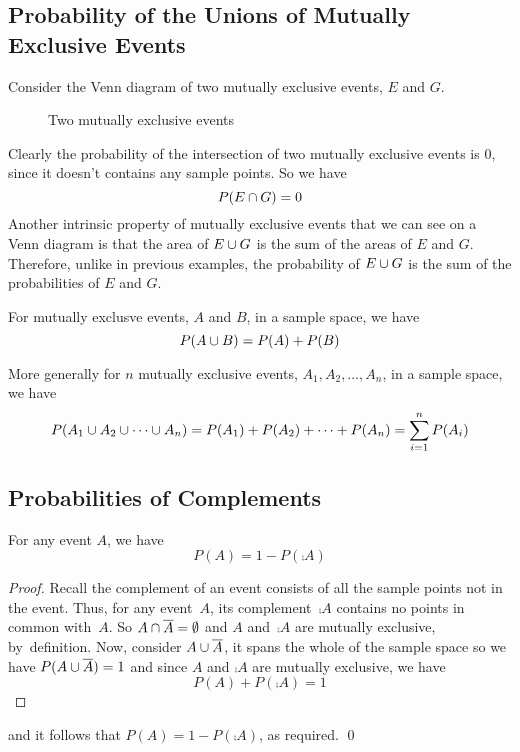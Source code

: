 \subsection*{Probability of the Unions of Mutually Exclusive Events}
Consider the Venn diagram of two mutually exclusive events, $E$ and $G$.
\begin{figure}[htp]
\centering
{}
\caption{Two mutually exclusive events} \label{fig:Two mutually exclusive events}
\end{figure}
Clearly the probability of the intersection of two mutually exclusive events is 0, since it doesn't contains any sample points. So we have 
\[
    P(E \cap G) = 0    
\]
Another intrinsic property of mutually exclusive events that we can see on a Venn diagram is that the area of $E \cup G$ is the sum of the areas of $E$ and $G$. Therefore, unlike in previous examples, the probability of $E \cup G$ is the sum of the probabilities of $E$ and $G$.
\begin{theorem}
For mutually exclusve events, $A$ and $B$, in a sample space, we have
\[
    P(A \cup B) = P(A) + P(B)
\]
\end{theorem}
\begin{theorem}
More generally for $n$ mutually exclusive events, $A_1,A_2,\ldots,A_n$, in a sample space, we have
\[
    P(A_1 \cup A_2 \cup \cdots \cup A_n) = P(A_1) + P(A_2) + \cdots + P(A_n) = \sum_{i = 1}^{n} P(A_i)
\]
\end{theorem}
\subsection*{Probabilities of Complements}
\begin{theorem}
For any event $A$, we have
\[
    P(A) = 1 - P(\comp{A})
\]
\end{theorem}
\begin{proof}
Recall the complement of an event consists of all the sample points not in the event. Thus, for any event~$A$, its complement~$\comp{A}$ contains no points in common with~$A$. So $A \cap \overline{A} = \emptyset$ and $A$ and~$\comp{A}$ are mutually exclusive, by~definition. Now, consider $A \cup \overline{A}$, it spans the whole of the sample space so we have $P(A \cup \overline{A}) = 1$ and since $A$ and $\comp{A}$ are mutually exclusive, we have
\[
    P(A) + P(\comp{A}) = 1
\]
\end{proof}
and it follows that $P(A) = 1 - P(\comp{A})$, as required. \qed

